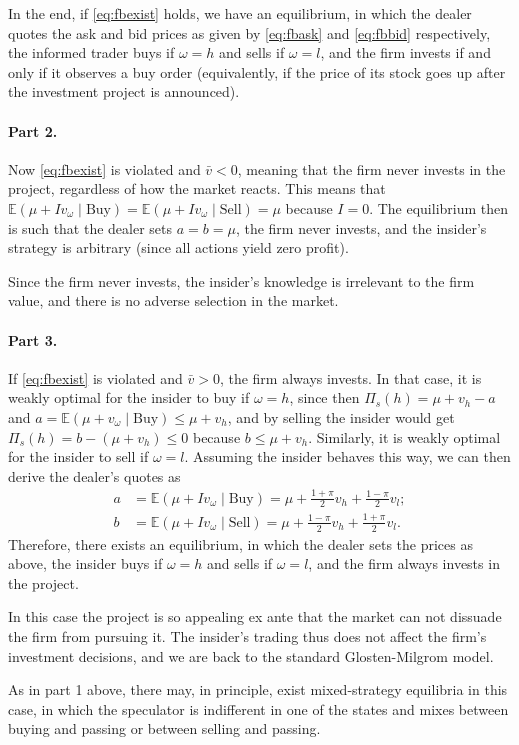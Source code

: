 \begin{solution}
\begin{enumerate}[label=(\alph{enumi})]
		In the end, if \eqref{eq:fbexist} holds, we have an equilibrium, in which the dealer quotes the ask and bid prices as given by \eqref{eq:fbask} and \eqref{eq:fbbid} respectively, the informed trader buys if $\omega=h$ and sells if $\omega=l$, and the firm invests if and only if it observes a buy order (equivalently, if the price of its stock goes up after the investment project is announced).
	\end{enumerate}
	
	
	\paragraph{Part 2.}
	Now \eqref{eq:fbexist} is violated and $\bar{v} < 0$, meaning that the firm never invests in the project, regardless of how the market reacts. This means that $\mathbb{E} \left( \mu + Iv_\omega \mid \text{Buy} \right) = \mathbb{E} \left( \mu + Iv_\omega \mid \text{Sell} \right) = \mu$ because $I=0$. The equilibrium then is such that the dealer sets $a=b=\mu$, the firm never invests, and the insider's strategy is arbitrary (since all actions yield zero profit).
	
	Since the firm never invests, the insider's knowledge is irrelevant to the firm value, and there is no adverse selection in the market.
	
	\paragraph{Part 3.}
	If \eqref{eq:fbexist} is violated and $\bar{v} > 0$, the firm always invests. In that case, it is weakly optimal for the insider to buy if $\omega=h$, since then $\Pi_s(h) = \mu+v_h - a$ and $a = \mathbb{E} (\mu + v_\omega \mid \text{Buy}) \leq \mu + v_h$, and by selling the insider would get $\Pi_s(h) = b-(\mu+v_h) \leq 0$ because $b \leq \mu + v_h$. Similarly, it is weakly optimal for the insider to sell if $\omega=l$. Assuming the insider behaves this way, we can then derive the dealer's quotes as
	\begin{align*}
		a &= \mathbb{E}(\mu + I v_\omega \mid \text{Buy}) = \mu + \frac{1+\pi}{2} v_h + \frac{1-\pi}{2} v_l;
		\\
		b &= \mathbb{E}(\mu + I v_\omega \mid \text{Sell}) = \mu + \frac{1-\pi}{2} v_h + \frac{1+\pi}{2} v_l.
	\end{align*}
	Therefore, there exists an equilibrium, in which the dealer sets the prices as above, the insider buys if $\omega=h$ and sells if $\omega=l$, and the firm always invests in the project. 
	
	In this case the project is so appealing ex ante that the market can not dissuade the firm from pursuing it. The insider's trading thus does not affect the firm's investment decisions, and we are back to the standard Glosten-Milgrom model.
	
	As in part 1 above, there may, in principle, exist mixed-strategy equilibria in this case, in which the speculator is indifferent in one of the states and mixes between buying and passing or between selling and passing.
\end{solution}




